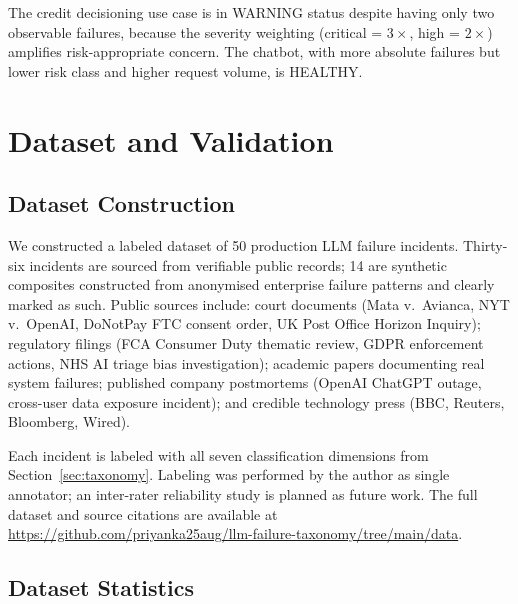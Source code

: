 \documentclass{article}
\begin{document}
The credit decisioning use case is in WARNING status despite having only two
observable failures, because the severity weighting (critical = $3\times$,
high = $2\times$) amplifies risk-appropriate concern.  The chatbot, with more
absolute failures but lower risk class and higher request volume, is HEALTHY.

\section{Dataset and Validation}
\label{sec:dataset}

\subsection{Dataset Construction}

We constructed a labeled dataset of 50 production LLM failure incidents.
Thirty-six incidents are sourced from verifiable public records; 14 are
synthetic composites constructed from anonymised enterprise failure patterns
and clearly marked as such.  Public sources include: court documents (Mata v.\
Avianca, NYT v.\ OpenAI, DoNotPay FTC consent order, UK Post Office Horizon
Inquiry); regulatory filings (FCA Consumer Duty thematic review, GDPR
enforcement actions, NHS AI triage bias investigation); academic papers
documenting real system failures; published company postmortems (OpenAI
ChatGPT outage, cross-user data exposure incident); and credible technology
press (BBC, Reuters, Bloomberg, Wired).

Each incident is labeled with all seven classification dimensions from
Section~\ref{sec:taxonomy}.  Labeling was performed by the author as single
annotator; an inter-rater reliability study is planned as future work.  The
full dataset and source citations are available at
\url{https://github.com/priyanka25aug/llm-failure-taxonomy/tree/main/data}.

\subsection{Dataset Statistics}
\end{document}
